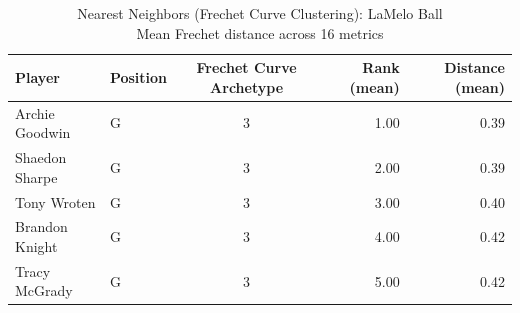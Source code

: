 \begin{table}[t]
\caption*{
{\fontsize{20}{25} Nearest Neighbors (Frechet Curve Clustering): LaMelo Ball\fontsize{12}{15}\selectfont } \\ 
{\fontsize{14}{17}\selectfont  Mean Frechet distance across 16 metrics\fontsize{12}{15}\selectfont }
} 
\fontsize{12.0pt}{14.0pt}\selectfont
\begin{tabular*}{\linewidth}{@{\extracolsep{\fill}}llcrr}
\toprule
Player & Position & Frechet Curve Archetype & Rank (mean) & Distance (mean) \\ 
\midrule\addlinespace[2.5pt]
Archie Goodwin & G & 3 & 1.00 & 0.39 \\ 
Shaedon Sharpe & G & 3 & 2.00 & 0.39 \\ 
Tony Wroten & G & 3 & 3.00 & 0.40 \\ 
Brandon Knight & G & 3 & 4.00 & 0.42 \\ 
Tracy McGrady & G & 3 & 5.00 & 0.42 \\ 
\bottomrule
\end{tabular*}
\end{table}

